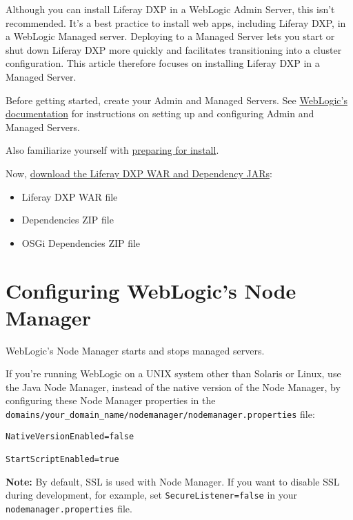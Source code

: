 Although you can install Liferay DXP in a WebLogic Admin Server, this
isn't recommended. It's a best practice to install web apps, including
Liferay DXP, in a WebLogic Managed server. Deploying to a Managed Server
lets you start or shut down Liferay DXP more quickly and facilitates
transitioning into a cluster configuration. This article therefore
focuses on installing Liferay DXP in a Managed Server.

Before getting started, create your Admin and Managed Servers. See
\href{http://www.oracle.com/technetwork/middleware/weblogic/documentation/index.html}{WebLogic's
documentation} for instructions on setting up and configuring Admin and
Managed Servers.

Also familiarize yourself with
\href{/docs/7-2/deploy/-/knowledge_base/d/preparing-for-install}{preparing
for install}.

Now,
\href{/docs/7-2/deploy/-/knowledge_base/d/obtaining-product\#downloading-the-liferay-war-and-dependency-jars}{download
the Liferay DXP WAR and Dependency JARs}:

\begin{itemize}
\tightlist
\item
  Liferay DXP WAR file
\item
  Dependencies ZIP file
\item
  OSGi Dependencies ZIP file
\end{itemize}

\section{Configuring WebLogic's Node
Manager}\label{configuring-weblogics-node-manager}

WebLogic's Node Manager starts and stops managed servers.

If you're running WebLogic on a UNIX system other than Solaris or Linux,
use the Java Node Manager, instead of the native version of the Node
Manager, by configuring these Node Manager properties in the
\texttt{domains/your\_domain\_name/nodemanager/nodemanager.properties}
file:

\begin{verbatim}
NativeVersionEnabled=false

StartScriptEnabled=true
\end{verbatim}

\noindent\hrulefill

\textbf{Note:} By default, SSL is used with Node Manager. If you want to
disable SSL during development, for example, set
\texttt{SecureListener=false} in your \texttt{nodemanager.properties}
file.

